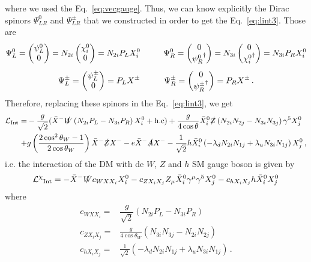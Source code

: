 where we used the Eq.~\eqref{eq:vecgauge}. Thus, we can know explicitly the Dirac spinors $\Psi_{LR}^0$ and $\Psi_{LR}^{\pm}$ that we constructed in order to get the Eq.~\eqref{eq:lint3}. Those are
\begin{align}
\Psi_L^0=\begin{pmatrix}
\psi_L^0 \\0
\end{pmatrix}
=N_{2i}\begin{pmatrix}
\chi_i^0 \\ 0
\end{pmatrix}
=N_{2i}P_LX_i^0
\hspace{1.0 cm}
\Psi_R^0=\begin{pmatrix}
0 \\ {{\psi}_R^0}^{\dagger}
\end{pmatrix}=N_{3i}\begin{pmatrix}
0 \\ {\chi_i^0}^{\dagger}
\end{pmatrix}=N_{3i}P_RX_i^0\nonumber
\end{align}
%
\begin{align}
\Psi_L^{\pm}=\begin{pmatrix}
\psi_L^{\pm} \\ 0
\end{pmatrix}=P_LX^{\pm}
\hspace{1.0 cm}
\Psi_R^{\pm}=\begin{pmatrix}
0\\ {\psi_R^{\pm}}^{\dagger}
\end{pmatrix}=P_RX^{\pm}\,.
\end{align}
%
Therefore, replacing these spinors in the Eq.~\eqref{eq:lint3}, we get
\begin{align}
\label{eq:lint4}
\mathcal{L}_{\text{Int}}= & 
-\dfrac{g}{\sqrt{2}}(\bar{X}^-\slashed{W}\left(N_{2i}P_L-N_{3i}P_R\right)X_i^0 + \text{h.c})
+ \dfrac{g}{4\cos\theta}\bar{X}_i^0\slashed{Z}\left(N_{2i}N_{2j}-N_{3i}N_{3j}\right)\gamma^5X_j^0 \nonumber\\
+& g\left(\dfrac{2\cos^2\theta_W-1}{2\cos\theta_W}\right)
\bar{X}^-\slashed{Z}X^-
-e\bar{X}^-\slashed{A}X^- 
-\dfrac{1}{\sqrt{2}}h\bar{X}_i^0\left(-\lambda_dN_{2i}N_{1j} + \lambda_uN_{3i}N_{1j}\right)X_j^0\,,
\end{align}
i.e. the interaction of the DM with de $W$, $Z$ and $h$ SM gauge boson is given by
\begin{align}
\mathcal{L^{\chi}}_{\text{Int}}=-\bar{X}^-\slashed{W}c_{WXX_i}X_i^0
-c_{ZX_iX_j}Z_{\mu}\bar{X}_i^0\gamma^{\mu}\gamma^{5}X_j^0
-c_{hX_iX_j}h\bar{X}_i^0X_j^0
\end{align}
where 
\begin{align}
c_{WXX_i}=& \dfrac{g}{\sqrt{2}}\left(N_{2i}P_L-N_{3i}P_R\right)  \label{eq:cWXXi}\\
c_{ZX_iX_j}=&\frac{g}{4\cos\theta_W}(N_{3i}N_{3j}-N_{2i}N_{2j}) \label{eq:cZXiXj}\\
c_{hX_iX_j}=&\frac{1}{\sqrt{2}}(-\lambda_dN_{2i}N_{1j}+\lambda_uN_{3i}N_{1j})\label{eq:cHXiXj}\,.
\end{align}










